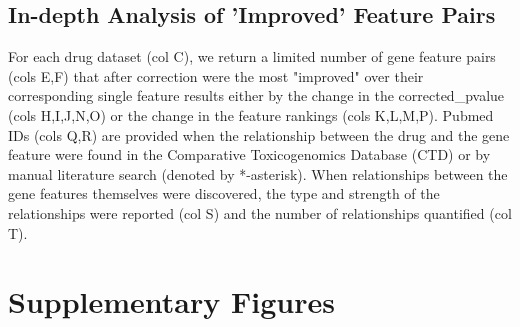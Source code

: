\subsection{In-depth Analysis of 'Improved' Feature Pairs}\label{appT:fp}
For each drug dataset (col C), we return a limited number of gene feature pairs (cols E,F) that after correction were the most "improved" over their corresponding single feature results either by the change in the corrected\_pvalue (cols H,I,J,N,O) or the change in the feature rankings (cols K,L,M,P).  Pubmed IDs (cols Q,R) are provided when the relationship between the drug and the gene feature were found in the Comparative Toxicogenomics Database (CTD) or by manual literature search (denoted by *-asterisk).  When relationships between the gene features themselves were discovered, the type and strength of the relationships were reported (col S) and the number of relationships quantified (col T).


\section{Supplementary Figures}

